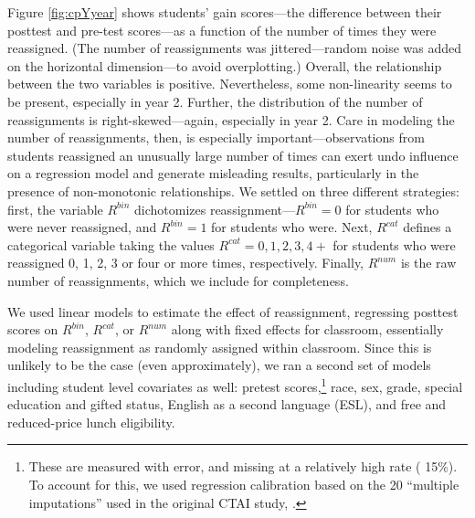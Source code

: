 \documentclass[12pt]{article}\usepackage[]{graphicx}\usepackage[]{color}
\begin{document}
Figure \ref{fig:cpYyear} shows students' gain scores---the difference between their posttest and pre-test scores---as a function of the number of times they were reassigned.
(The number of reassignments was jittered---random noise was added on
the horizontal dimension---to avoid overplotting.)
Overall, the relationship between the two variables is positive.
Nevertheless, some non-linearity seems to be present, especially in year 2.
Further, the distribution of the number of reassignments is right-skewed---again, especially in year 2.
Care in modeling the number of reassignments, then, is especially important---observations from students reassigned an unusually large number of times can exert undo influence on a regression model and generate misleading results, particularly in the presence of non-monotonic relationships.
We settled on three different strategies: first, the variable $R^{bin}$ dichotomizes reassignment---$R^{bin}=0$ for students who were never reassigned, and $R^{bin}=1$ for students who were.
Next, $R^{cat}$ defines a categorical variable taking the values $R^{cat}=0,1,2,3,4+$ for students who were reassigned 0, 1, 2, 3 or four or more times, respectively.
Finally, $R^{num}$ is the raw number of reassignments, which we include for completeness.

We used linear models to estimate the effect of reassignment, regressing posttest scores on $R^{bin}$, $R^{cat}$, or $R^{num}$ along with fixed effects for classroom, essentially modeling reassignment as randomly assigned within classroom.
Since this is unlikely to be the case (even approximately), we ran a
second set of models including student level covariates as well:
pretest scores,\footnote{These are measured with error, and missing at a relatively high rate (
15\%). To account for
this, we used regression calibration based on the 20 ``multiple
imputations'' used in the original CTAI study,
\citet{pane2014effectiveness}.} race, sex, grade, special education
and gifted status, English as a second language (ESL), and free and reduced-price lunch eligibility.
\end{document}
